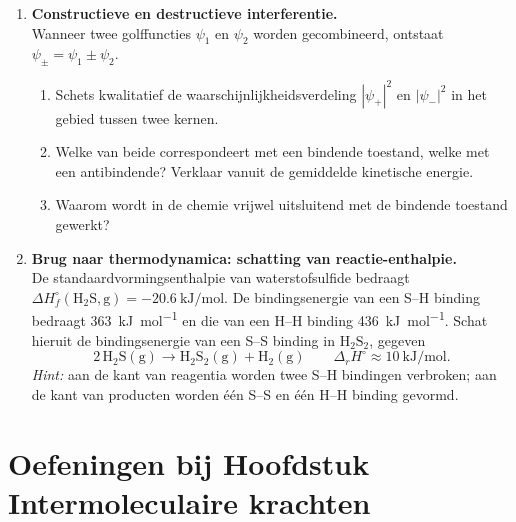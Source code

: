 \begin{enumerate}
\item \textbf{Constructieve en destructieve interferentie.} \\
Wanneer twee golffuncties $\psi_1$ en $\psi_2$ worden gecombineerd, ontstaat $\psi_{\pm} = \psi_1 \pm \psi_2$.
\begin{enumerate}
\item[(a)] Schets kwalitatief de waarschijnlijkheidsverdeling $|\psi_+|^2$ en $|\psi_-|^2$ in het gebied tussen twee kernen.
\item[(b)] Welke van beide correspondeert met een bindende toestand, welke met een antibindende? Verklaar vanuit de gemiddelde kinetische energie.
\item[(c)] Waarom wordt in de chemie vrijwel uitsluitend met de bindende toestand gewerkt?
\end{enumerate}

\item \textbf{Brug naar thermodynamica: schatting van reactie-enthalpie.} \\
De standaardvormingsenthalpie van waterstofsulfide bedraagt $\Delta H_f^\circ(\mathrm{H_2S,g}) = \SI{-20.6}{\kilo\joule\per\mole}$. De bindingsenergie van een S--H binding bedraagt \SI{363}{\kilo\joule\per\mole} en die van een H--H binding \SI{436}{\kilo\joule\per\mole}. Schat hieruit de bindingsenergie van een S--S binding in $\mathrm{H_2S_2}$, gegeven
\[
\mathrm{2\,H_2S(g) \rightarrow H_2S_2(g) + H_2(g)} \qquad \Delta_r H^\circ \approx \SI{+10}{\kilo\joule\per\mole}.
\]
\emph{Hint:} aan de kant van reagentia worden twee S--H bindingen verbroken; aan de kant van producten worden \'e\'en S--S en \'e\'en H--H binding gevormd.

\end{enumerate}


\section*{Oefeningen bij Hoofdstuk Intermoleculaire krachten}

